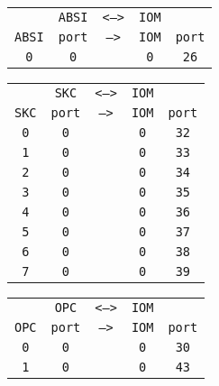 \begin{adjustwidth}{5ex}{1ex}
	\begin{tabular}{ccccc}
		& \texttt{ABSI} & \texttt{<-->} & \texttt{IOM} &  \\
		\texttt{ABSI} & \texttt{port} & \texttt{-->} & \texttt{IOM} & \texttt{port} \\
		\texttt{0} & \texttt{0} & & \texttt{0} & \texttt{26} \\
	\end{tabular}
\end{adjustwidth}

\begin{adjustwidth}{5ex}{1ex}
	\begin{tabular}{ccccc}
		& \texttt{SKC} & \texttt{<-->} & \texttt{IOM} &  \\
		\texttt{SKC} & \texttt{port} & \texttt{-->} & \texttt{IOM} & \texttt{port} \\
		\texttt{0} & \texttt{0} & & \texttt{0} & \texttt{32} \\
		\texttt{1} & \texttt{0} & & \texttt{0} & \texttt{33} \\
		\texttt{2} & \texttt{0} & & \texttt{0} & \texttt{34} \\
		\texttt{3} & \texttt{0} & & \texttt{0} & \texttt{35} \\
		\texttt{4} & \texttt{0} & & \texttt{0} & \texttt{36} \\
		\texttt{5} & \texttt{0} & & \texttt{0} & \texttt{37} \\
		\texttt{6} & \texttt{0} & & \texttt{0} & \texttt{38} \\
		\texttt{7} & \texttt{0} & & \texttt{0} & \texttt{39} \\
	\end{tabular}
\end{adjustwidth}

\begin{adjustwidth}{5ex}{1ex}
	\begin{tabular}{ccccc}
		& \texttt{OPC} & \texttt{<-->} & \texttt{IOM} &  \\
		\texttt{OPC} & \texttt{port} & \texttt{-->} & \texttt{IOM} & \texttt{port} \\
		\texttt{0} & \texttt{0} & & \texttt{0} & \texttt{30} \\
		\texttt{1} & \texttt{0} & & \texttt{0} & \texttt{43} \\
	\end{tabular}
\end{adjustwidth}

